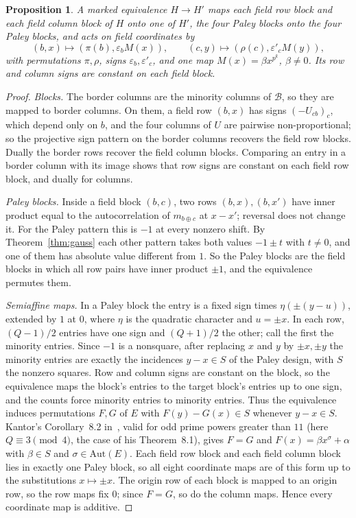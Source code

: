 \documentclass[11pt]{article}
\theoremstyle{plain}
\newtheorem{proposition}[theorem]{Proposition}
\theoremstyle{definition}
\theoremstyle{remark}
\newcommand{\Aut}{\mathrm{Aut}}
\begin{document}
\begin{proposition}\label{prop:frame}
A marked equivalence $H\to H'$ maps each field row block and each field
column block of $H$ onto one of $H'$, the four Paley blocks onto the four
Paley blocks, and acts on field coordinates by
\[
(b,x)\mapsto(\pi(b),\varepsilon_bM(x)),\qquad(c,y)\mapsto(\rho(c),\varepsilon'_cM(y)),
\]
with permutations $\pi,\rho$, signs $\varepsilon_b,\varepsilon'_c$, and one
map $M(x)=\beta x^{p^k}$, $\beta\ne0$. Its row and column signs are constant
on each field block.
\end{proposition}

\begin{proof}
\emph{Blocks.} The border columns are the minority columns of $\mathcal B$,
so they are mapped to border columns. On them, a field row $(b,x)$ has signs
$(-U_{cb})_c$, which depend only on $b$, and the four columns of $U$ are
pairwise non-proportional; so the projective sign pattern on the border
columns recovers the field row blocks. Dually the border rows recover the
field column blocks. Comparing an entry in a border column with its image
shows that row signs are constant on each field row block, and dually for
columns.

\emph{Paley blocks.} Inside a field block $(b,c)$, two rows $(b,x),(b,x')$
have inner product equal to the autocorrelation of $m_{b\oplus c}$ at
$x-x'$; reversal does not change it. For the Paley pattern this is $-1$ at
every nonzero shift. By Theorem~\ref{thm:gauss} each other pattern takes both
values $-1\pm t$ with $t\neq0$, and one of them has absolute value different
from $1$. So the Paley blocks are the field blocks in which all row pairs have
inner product $\pm1$, and the equivalence permutes them.

\emph{Semiaffine maps.} In a Paley block the entry is a fixed sign times
$\eta(\pm(y-u))$, extended by $1$ at $0$, where $\eta$ is the quadratic
character and $u=\pm x$. In each row, $(Q-1)/2$ entries have one sign and
$(Q+1)/2$ the other; call the first the minority entries. Since $-1$ is a
nonsquare, after replacing $x$ and $y$ by $\pm x,\pm y$ the minority entries
are exactly the incidences $y-x\in S$ of the Paley design, with $S$ the
nonzero squares. Row and column signs are constant on the block, so the
equivalence maps the block's entries to the target block's entries up to one
sign, and the counts force minority entries to minority entries. Thus the
equivalence induces permutations $F,G$ of $E$ with $F(y)-G(x)\in S$ whenever
$y-x\in S$.
Kantor's Corollary~8.2 in~\cite{Kantor2T}, valid for odd prime powers
greater than $11$ (here $Q\equiv3\pmod4$, the case of his Theorem~8.1), gives $F=G$ and $F(x)=\beta x^\sigma+\alpha$ with
$\beta\in S$ and $\sigma\in\Aut(E)$. Each field row block and each field
column block lies in exactly one Paley block, so all eight coordinate maps
are of this form up to the substitutions $x\mapsto\pm x$. The origin row of
each block is mapped to an origin row, so the row maps fix $0$; since $F=G$,
so do the column maps. Hence every coordinate map is additive.


\end{proof}
\end{document}
